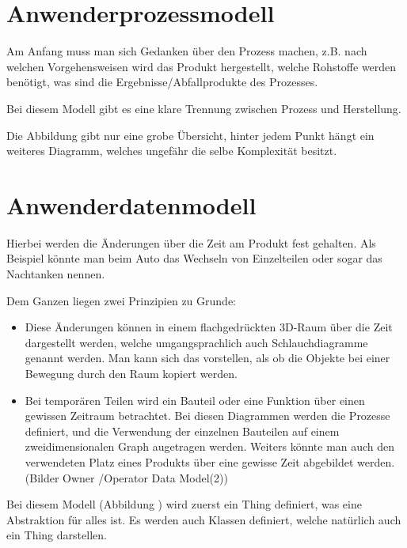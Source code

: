 \section{Anwenderprozessmodell}
Am Anfang muss man sich Gedanken über den Prozess machen, z.B. nach welchen Vorgehensweisen wird das Produkt hergestellt, welche Rohstoffe werden benötigt, was sind die Ergebnisse/Abfallprodukte des Prozesses.

Bei diesem Modell gibt es eine klare Trennung zwischen Prozess und Herstellung.


Die Abbildung  gibt nur eine grobe Übersicht, hinter jedem Punkt hängt ein weiteres Diagramm, welches ungefähr die selbe Komplexität besitzt.

\section{Anwenderdatenmodell}
Hierbei werden die Änderungen über die Zeit am Produkt fest gehalten. Als Beispiel könnte man beim Auto das Wechseln von Einzelteilen oder sogar das Nachtanken nennen.

Dem Ganzen liegen zwei Prinzipien zu Grunde:

\begin{itemize}
\item Diese Änderungen können in einem flachgedrückten 3D-Raum über die Zeit dargestellt werden, welche umgangsprachlich auch Schlauchdiagramme genannt werden. Man kann sich das vorstellen, als ob die Objekte bei einer Bewegung durch den Raum kopiert werden.
\item Bei temporären Teilen wird ein Bauteil oder eine Funktion über einen gewissen Zeitraum betrachtet. Bei diesen Diagrammen werden die Prozesse definiert, und die Verwendung der einzelnen Bauteilen auf einem zweidimensionalen Graph augetragen werden. Weiters könnte man auch den verwendeten Platz eines Produkts über eine gewisse Zeit abgebildet werden. (Bilder Owner /Operator Data Model(2))
\end{itemize}


Bei diesem Modell (Abbildung ) wird zuerst ein Thing definiert, was eine Abstraktion für alles ist. Es werden auch Klassen definiert, welche natürlich auch ein Thing darstellen.


